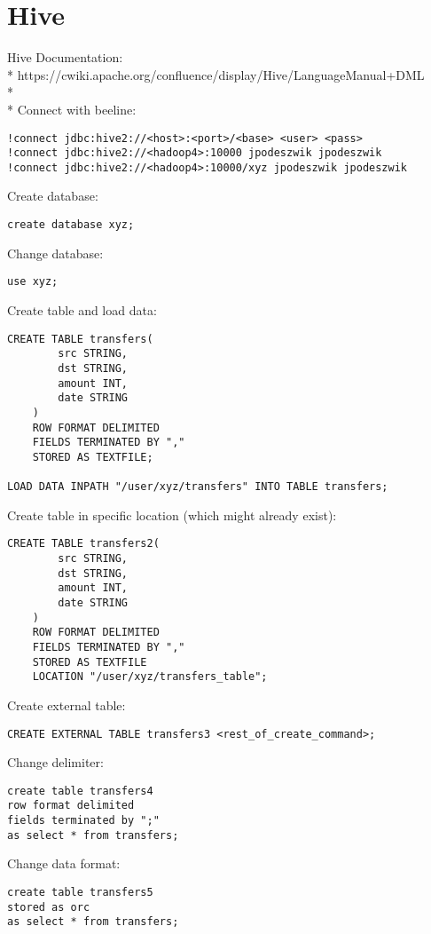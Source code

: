 \documentclass{article}
\begin{document}
\section*{Hive}

Hive Documentation:
\\*
https://cwiki.apache.org/confluence/display/Hive/LanguageManual+DML
\\*
\\*
Connect with beeline:
\begin{lstlisting}
!connect jdbc:hive2://<host>:<port>/<base> <user> <pass>
!connect jdbc:hive2://<hadoop4>:10000 jpodeszwik jpodeszwik
!connect jdbc:hive2://<hadoop4>:10000/xyz jpodeszwik jpodeszwik
\end{lstlisting}

Create database:
\begin{lstlisting}
create database xyz;
\end{lstlisting}

Change database:
\begin{lstlisting}
use xyz;
\end{lstlisting}

Create table and load data:
\begin{lstlisting}
CREATE TABLE transfers(
		src STRING,
		dst STRING,
		amount INT,
		date STRING
	)
	ROW FORMAT DELIMITED
	FIELDS TERMINATED BY ","
	STORED AS TEXTFILE;

LOAD DATA INPATH "/user/xyz/transfers" INTO TABLE transfers;
\end{lstlisting}

Create table in specific location (which might already exist):
\begin{lstlisting}
CREATE TABLE transfers2(
		src STRING,
		dst STRING,
		amount INT,
		date STRING
	)
	ROW FORMAT DELIMITED
	FIELDS TERMINATED BY ","
	STORED AS TEXTFILE
	LOCATION "/user/xyz/transfers_table";
\end{lstlisting}

Create external table:
\begin{lstlisting}
CREATE EXTERNAL TABLE transfers3 <rest_of_create_command>;
\end{lstlisting}

Change delimiter:
\begin{lstlisting}
create table transfers4
row format delimited
fields terminated by ";"
as select * from transfers;
\end{lstlisting}

Change data format:
\begin{lstlisting}
create table transfers5
stored as orc
as select * from transfers;
\end{lstlisting}
\end{document}
